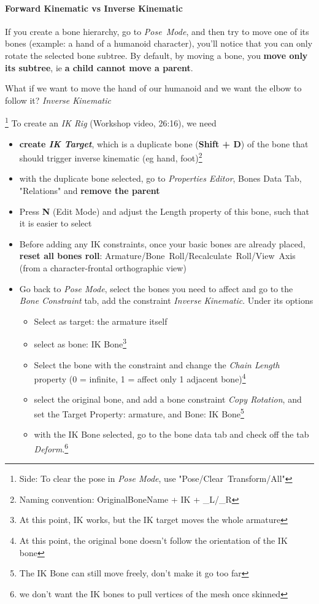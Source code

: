 \documentclass{article}
\begin{document}
\paragraph{Forward Kinematic vs Inverse Kinematic}
If you create a bone hierarchy, go to \mbox{\textit{Pose Mode}}, and then try to move one of its bones (example: a hand of a humanoid character), you'll notice that you can only rotate the selected bone
subtree. By default, by moving a bone, you \textbf{move only its subtree}, ie \textbf{a child cannot move a parent}.\par
What if we want to move the hand of our humanoid and we want the elbow to follow it? \textit{Inverse Kinematic}\par\footnote{Side: To clear the pose in \textit{Pose Mode}, use \mbox{"Pose/Clear Transform/All"}}
To create an \textit{IK Rig} (Workshop video, 26:16), we need
\begin{itemize}[noitemsep, topsep=0pt]
    \item \textbf{create \textit{IK Target}}, which is a duplicate bone (\textbf{Shift + D}) of the bone that should trigger inverse kinematic (eg hand, foot)\footnote{Naming convention: OriginalBoneName + IK + \_L/\_R}
    \item with the duplicate bone selected, go to \textit{Properties Editor}, Bones Data Tab, "Relations" and \textbf{remove the parent}
    \item Press \textbf{N} (Edit Mode) and adjust the Length property of this bone, such that it is easier to select
    \item Before adding any IK constraints, once your basic bones are already placed, \textbf{reset all bones roll}: \mbox{Armature/Bone Roll/Recalculate Roll/View Axis} (from a character-frontal orthographic view)
    \item Go back to \textit{Pose Mode}, select the bones you need to affect and go to the \textit{Bone Constraint} tab, add the constraint \textit{Inverse Kinematic}. Under its options
    \begin{itemize}[noitemsep, topsep=0pt]
        \item Select as target: the armature itself
        \item select as bone: IK Bone\footnote{At this point, IK works, but the IK target moves the whole armature}
        \item Select the bone with the constraint and change the \textit{Chain Length} property (0 = infinite, 1 = affect only 1 adjacent bone)\footnote{At this point, the original bone doesn't follow the orientation of the IK bone}
        \item select the original bone, and add a bone constraint \textit{Copy Rotation}, and set the Target Property: armature, and Bone: IK Bone\footnote{The IK Bone can still move freely, don't make it go too far}
        \item with the IK Bone selected, go to the bone data tab and check off the tab \textit{Deform}.\footnote{we don't want the IK bones to pull vertices of the mesh once skinned}
    \end{itemize}
\end{itemize}
\end{document}
